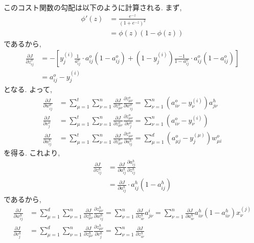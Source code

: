 \documentclass[uplatex]{jsarticle}
\theoremstyle{definition}
\numberwithin{equation}{section}
\begin{document}
このコスト関数の勾配は以下のように計算される.
まず, 
\begin{align*}
    \phi'(z) 
    &= \frac{e^{-z}}{(1 + e^{-z})^{2}} \\
    &= \phi(z)(1 - \phi(z))
\end{align*}
であるから, 
\begin{align*}
    \frac{\partial J}{\partial z^{o}_{ij}}
    &= -\left[y^{(i)}_{j}\frac{1}{a^{o}_{ij}} \cdot a^{o}_{ij}(1 - a^{o}_{ij}) + (1 - y^{(i)}_{j})\frac{-1}{1 - a^{o}_{ij}} \cdot a^{o}_{ij}(1 - a^{o}_{ij})\right] \\
    &= a^{o}_{ij} - y^{(i)}_{j}
\end{align*}
となる.
よって, 
\begin{align*}
    \frac{\partial J}{\partial w^{o}_{ij}}
    &= \sum_{\mu = 1}^{t}\sum_{\nu = 1}^{n} \frac{\partial J}{\partial z^{o}_{\mu\nu}}\frac{\partial z^{o}_{\mu\nu}}{\partial w^{o}_{ij}}
    = \sum_{\nu = 1}^{n} (a^{o}_{i\nu} - y^{(i)}_{\nu})a^{h}_{j\nu} \\
    \frac{\partial J}{\partial v^{o}_{j}}
    &= \sum_{\mu = 1}^{t}\sum_{\nu = 1}^{n} \frac{\partial J}{\partial z^{o}_{\mu\nu}}\frac{\partial z^{o}_{\mu\nu}}{\partial v^{o}_{j}}
    = \sum_{\nu = 1}^{n} (a^{o}_{i\nu} - y^{(i)}_{\nu}) \\
    \frac{\partial J}{\partial a^{h}_{ij}}
    &= \sum_{\mu = 1}^{t}\sum_{\nu = 1}^{n} \frac{\partial J}{\partial z^{o}_{\mu\nu}}\frac{\partial z^{o}_{\mu\nu}}{\partial a^{h}_{ij}}
    = \sum_{\mu = 1}^{d} (a^{o}_{\mu j} - y^{(\mu)}_{j})w^{o}_{\mu i}
\end{align*}
を得る.
これより, 
\begin{align*}
    \frac{\partial J}{\partial z^{h}_{ij}}
    &= \frac{\partial J}{\partial a^{h}_{ij}}\frac{\partial a^{h}_{ij}}{\partial z^{h}_{ij}} \\
    &= \frac{\partial J}{\partial a^{h}_{ij}} \cdot a^{h}_{ij}(1 - a^{h}_{ij})
\end{align*}
であるから,
\begin{align*}
    \frac{\partial J}{\partial w^{h}_{ij}}
    &= \sum_{\mu = 1}^{d}\sum_{\nu = 1}^{n} \frac{\partial J}{\partial z^{h}_{\mu\nu}}\frac{\partial z^{h}_{\mu\nu}}{\partial w^{h}_{ij}}
    = \sum_{\nu = 1}^{n} \frac{\partial J}{\partial z^{h}_{i\nu}}a^{i}_{j\nu}
    = \sum_{\nu = 1}^{n} \frac{\partial J}{\partial a^{h}_{i\nu}}a^{h}_{i\nu}(1 - a^{h}_{i\nu})x^{(j)}_{\nu} \\
    \frac{\partial J}{\partial v^{h}_{j}}
    &= \sum_{\mu = 1}^{d}\sum_{\nu = 1}^{n} \frac{\partial J}{\partial z^{h}_{\mu\nu}}\frac{\partial z^{h}_{\mu\nu}}{\partial v^{h}_{j}}
    = \sum_{\nu = 1}^{n} \frac{\partial J}{\partial z^{h}_{i\nu}}
\end{align*}
\end{document}
